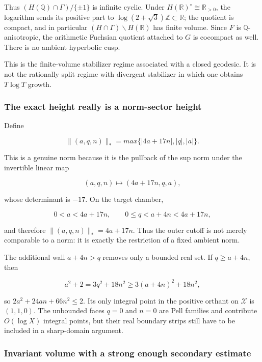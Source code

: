 Thus \((H(\mathbb Q)\cap\Gamma)/\{\pm1\}\) is infinite cyclic.  Under
\(H(\mathbb R)^\circ\cong\mathbb R_{>0}\), the logarithm sends its positive
part to \(\log(2+\sqrt3)\mathbb Z\subset\mathbb R\); the quotient is compact,
and in particular \((H\cap\Gamma)\backslash H(\mathbb R)\) has finite
volume. Since \(F\) is \(\mathbb Q\)-anisotropic, the arithmetic Fuchsian
quotient attached to \(G\) is cocompact as well. There is no ambient
hyperbolic cusp.

This is the finite-volume stabilizer regime associated with a closed geodesic.
It is not the rationally split regime with divergent stabilizer in which one
obtains \(T\log T\) growth.

\subsubsection{The exact height really is a norm-sector height}\label{koide-lit-the-exact-height-really-is-a-norm-sector-height}

Define

\[
 \|(a,q,n)\|_*=max\{|4a+17n|,|q|,|a|\}.
\]

This is a genuine norm because it is the pullback of the sup norm under the invertible linear map

\[
 (a,q,n)\longmapsto(4a+17n,q,a),
\]

whose determinant is \(-17\). On the target chamber,

\[
 0<a<4a+17n,
 \qquad 0\leq q<a+4n<4a+17n,
\]

and therefore \(\|(a,q,n)\|_*=4a+17n\). Thus the outer cutoff is not merely comparable to a norm: it is exactly the restriction of a fixed ambient norm.

The additional wall \(a+4n>q\) removes only a bounded real set. If \(q\geq a+4n\), then

\[
 a^2+2=3q^2+18n^2
 \geq3(a+4n)^2+18n^2,
\]

so \(2a^2+24an+66n^2\leq2\). Its only integral point in the positive orthant on \(\mathscr X\) is \((1,1,0)\). The unbounded faces \(q=0\) and \(n=0\) are Pell families and contribute \(O(\log X)\) integral points, but their real boundary strips still have to be included in a sharp-domain argument.

\subsubsection{Invariant volume with a strong enough secondary estimate}\label{koide-lit-invariant-volume-with-a-strong-enough-secondary-estimate}

